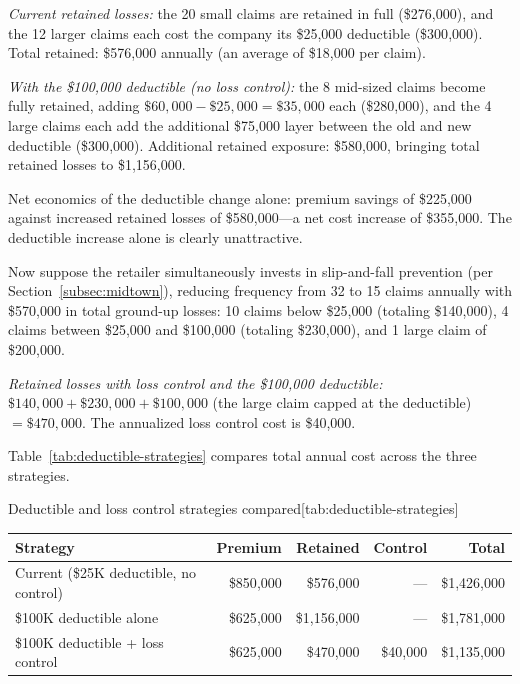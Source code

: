 \documentclass[11pt,openany]{book}
\begin{document}
\emph{Current retained losses:} the 20 small claims are retained in full
(\$276{,}000), and the 12 larger claims each cost the company its \$25{,}000
deductible (\$300{,}000). Total retained: \$576{,}000 annually (an average of
\$18{,}000 per claim).

\emph{With the \$100{,}000 deductible (no loss control):} the 8 mid-sized
claims become fully retained, adding \(\$60{,}000 - \$25{,}000 = \$35{,}000\)
each (\$280{,}000), and the 4 large claims each add the additional \$75{,}000
layer between the old and new deductible (\$300{,}000). Additional retained
exposure: \$580{,}000, bringing total retained losses to \$1{,}156{,}000.

Net economics of the deductible change alone: premium savings of \$225{,}000
against increased retained losses of \$580{,}000---a net cost increase of
\$355{,}000. The deductible increase alone is clearly unattractive.

Now suppose the retailer simultaneously invests in slip-and-fall prevention
(per Section~\ref{subsec:midtown}), reducing frequency from 32 to 15 claims
annually with \$570{,}000 in total ground-up losses: 10 claims below
\$25{,}000 (totaling \$140{,}000), 4 claims between \$25{,}000 and \$100{,}000
(totaling \$230{,}000), and 1 large claim of \$200{,}000.

\emph{Retained losses with loss control and the \$100{,}000 deductible:}
\(\$140{,}000 + \$230{,}000 + \$100{,}000\) (the large claim capped at the
deductible) \(= \$470{,}000\). The annualized loss control cost is \$40{,}000.

Table~\ref{tab:deductible-strategies} compares total annual cost across the
three strategies.

\begin{ermtable}{Deductible and loss control strategies compared}[tab:deductible-strategies]
\begin{tabularx}{\linewidth}{@{}Yrrrr@{}}
\toprule
\textbf{Strategy} & \textbf{Premium} & \textbf{Retained} &
\textbf{Control} & \textbf{Total} \\
\midrule
Current (\$25K deductible, no control) & \$850{,}000 & \$576{,}000 & --- &
\$1{,}426{,}000 \\
\$100K deductible alone & \$625{,}000 & \$1{,}156{,}000 & --- &
\$1{,}781{,}000 \\
\$100K deductible + loss control & \$625{,}000 & \$470{,}000 & \$40{,}000 &
\$1{,}135{,}000 \\
\bottomrule
\end{tabularx}
\end{ermtable}
\end{document}
